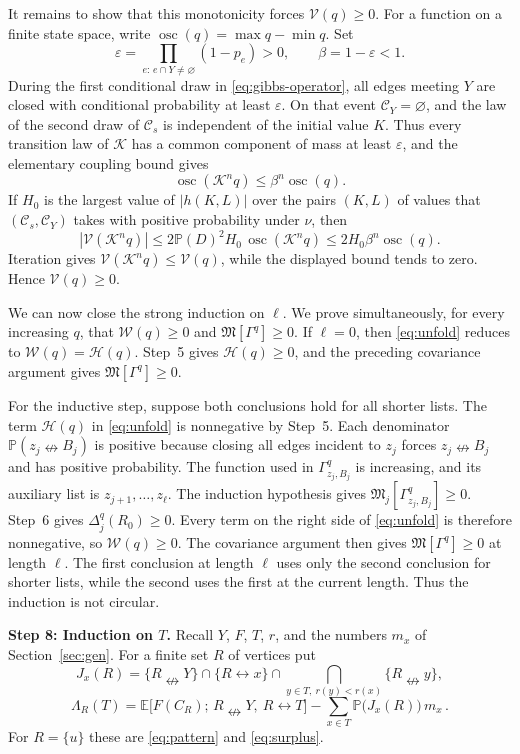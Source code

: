 \documentclass[11pt]{article}
\theoremstyle{definition}
\theoremstyle{remark}
\newcommand{\PP}{\mathbb P}
\newcommand{\EE}{\mathbb E}
\newcommand{\con}{\leftrightarrow}
\newcommand{\ncon}{\nleftrightarrow}
\newcommand{\eC}{\mathcal C}
\newcommand{\Marg}{\mathfrak M}
\begin{document}
It remains to show that this monotonicity forces $\mathcal V(q)\geq0$. For a function on a
finite state space, write $\operatorname{osc}(q)=\max q-\min q$. Set
\[
 \varepsilon=\prod_{e:\,e\cap Y\neq\varnothing}(1-p_e)>0,
 \qquad \beta=1-\varepsilon<1.
\]
During the first conditional draw in \eqref{eq:gibbs-operator}, all edges meeting $Y$ are
closed with conditional probability at least $\varepsilon$. On that event
$\eC_Y=\varnothing$, and the law of the second draw of $\eC_s$ is independent of the
initial value $K$. Thus every transition law of $\mathcal K$ has a common component of
mass at least $\varepsilon$, and the elementary coupling bound gives
\[
 \operatorname{osc}(\mathcal K^nq)\leq
 \beta^n\operatorname{osc}(q).
\]
If $H_0$ is the largest value of $|h(K,L)|$ over the pairs $(K,L)$ of values that
$(\eC_s,\eC_Y)$ takes with positive probability under $\nu$, then
\[
 |\mathcal V(\mathcal K^nq)|
 \leq2\PP(D)^2H_0\,\operatorname{osc}(\mathcal K^nq)
 \leq2H_0\beta^n\operatorname{osc}(q).
\]
Iteration gives $\mathcal V(\mathcal K^nq)\leq\mathcal V(q)$, while the displayed bound
tends to zero. Hence $\mathcal V(q)\geq0$.

We can now close the strong induction on $\ell$. We prove simultaneously, for every
increasing $q$, that $\mathcal W(q)\geq0$ and $\Marg[\Gamma^q]\geq0$. If $\ell=0$, then
\eqref{eq:unfold} reduces to $\mathcal W(q)=\mathcal H(q)$. Step~5 gives
$\mathcal H(q)\geq0$, and the preceding covariance argument gives
$\Marg[\Gamma^q]\geq0$.

For the inductive step, suppose both conclusions hold for all shorter lists. The term
$\mathcal H(q)$ in \eqref{eq:unfold} is nonnegative by Step~5. Each denominator
$\PP(z_j\ncon B_j)$ is positive because closing all edges incident to $z_j$ forces
$z_j\ncon B_j$ and has positive probability. The function used in
$\Gamma^q_{z_j,B_j}$ is increasing, and its auxiliary list is
$z_{j+1},\ldots,z_\ell$. The induction hypothesis gives
$\Marg_j[\Gamma^q_{z_j,B_j}]\geq0$. Step~6 gives $\Delta^q_j(R_0)\geq0$. Every term on the
right side of \eqref{eq:unfold} is therefore nonnegative, so $\mathcal W(q)\geq0$. The
covariance argument then gives $\Marg[\Gamma^q]\geq0$ at length $\ell$. The first conclusion
at length $\ell$ uses only the second conclusion for shorter lists, while the second uses
the first at the current length. Thus the induction is not circular.

\medskip\noindent\textbf{Step 8: Induction on $T$.}
Recall $Y$, $F$, $T$, $r$, and the numbers $m_x$ of Section~\ref{sec:gen}. For a finite set
$R$ of vertices put
\[
 J_x(R)=\{R\ncon Y\}\cap\{R\con x\}\cap\bigcap_{y\in T,\ r(y)<r(x)}\{R\ncon y\},
\]
\[
 \Lambda_R(T)=\EE\bigl[F(C_R);\,R\ncon Y,\ R\con T\bigr]
 -\sum_{x\in T}\PP\bigl(J_x(R)\bigr)\,m_x\,.
\]
For $R=\{u\}$ these are \eqref{eq:pattern} and \eqref{eq:surplus}.
\end{document}
